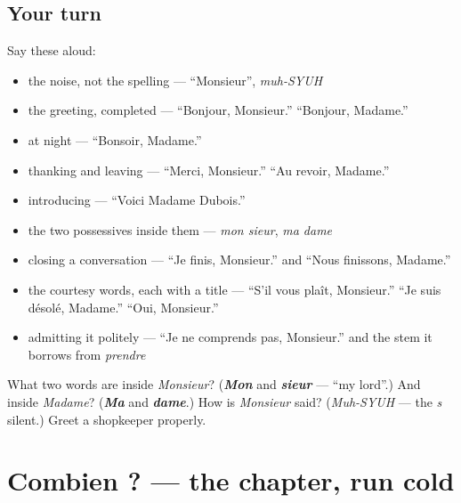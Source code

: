 \subsection*{Your turn}
Say these aloud:

\begin{itemize}
\raggedright
  \item the noise, not the spelling — \textquotedblleft{}Monsieur\textquotedblright{}, \emph{muh-SYUH}
  \item the greeting, completed — \textquotedblleft{}Bonjour, Monsieur.\textquotedblright{} \textquotedblleft{}Bonjour, Madame.\textquotedblright{}
  \item at night — \textquotedblleft{}Bonsoir, Madame.\textquotedblright{}
  \item thanking and leaving — \textquotedblleft{}Merci, Monsieur.\textquotedblright{} \textquotedblleft{}Au revoir, Madame.\textquotedblright{}
  \item introducing — \textquotedblleft{}Voici Madame Dubois.\textquotedblright{}
  \item the two possessives inside them — \emph{mon sieur}, \emph{ma dame}
  \item closing a conversation — \textquotedblleft{}Je finis, Monsieur.\textquotedblright{} and \textquotedblleft{}Nous finissons, Madame.\textquotedblright{}
  \item the courtesy words, each with a title — \textquotedblleft{}S'il vous plaît, Monsieur.\textquotedblright{} \textquotedblleft{}Je suis désolé, Madame.\textquotedblright{} \textquotedblleft{}Oui, Monsieur.\textquotedblright{}
  \item admitting it politely — \textquotedblleft{}Je ne comprends pas, Monsieur.\textquotedblright{} and the stem it borrows from \emph{prendre}
\end{itemize}

\begin{tcolorbox}[breakable,colback=teal!4,colframe=teal!35!black,title={Before you move on}]
What two words are inside \emph{Monsieur}? (\emph{\textbf{Mon}} and \emph{\textbf{sieur}} — \textquotedblleft{}my lord\textquotedblright{}.) And inside \emph{Madame}? (\emph{\textbf{Ma}} and \emph{\textbf{dame}}.) How is \emph{Monsieur} said? (\emph{Muh-SYUH} — the \emph{s} silent.) Greet a shopkeeper properly.
\end{tcolorbox}
\section[Practice]{Combien ? — the chapter, run cold}

